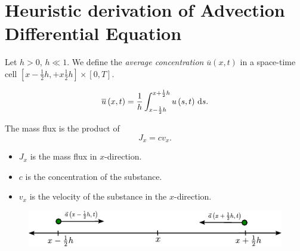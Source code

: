 \section{Heuristic derivation of Advection Differential Equation}

\begin{frame}
    \begin{definition}
        Let $h>0$, $h\ll 1$.
        We define the \emph{average concentration}
        $\overline{u}\left(x,t\right)$ in a space-time cell
        \begin{math}
            \left[
                x-\frac{1}{2}h,
                +x\frac{1}{2}h
                \right]\times
            \left[0,T\right]
        \end{math}.

        \begin{equation*}
            \overline{u}
            \left(x,t\right)=
            \dfrac{1}{h}
            \int_{x-\frac{1}{2}h}^{x+\frac{1}{2}h}
            u\left(s,t\right)
            \dl s.
        \end{equation*}
    \end{definition}

    \begin{definition}
        The mass flux is the product of
        \begin{equation*}
            J_{x}=
            c
            v_{x}.
        \end{equation*}
        \begin{itemize}
            \item $J_{x}$ is the mass flux in $x$-direction.
            \item $c$ is the concentration of the substance.
            \item $v_{x}$ is the velocity of the substance in the $x$-direction.
        \end{itemize}
    \end{definition}

    \begin{figure}[ht!]
        \centering
        \includegraphics[width=.6\paperwidth]{deduction}
    \end{figure}
\end{frame}

